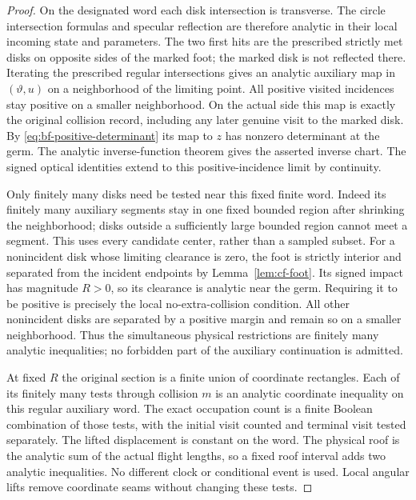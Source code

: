 \begin{proof}
On the designated word each disk intersection is transverse.
The circle intersection formulas and specular reflection are
therefore analytic in their local incoming state and parameters.
The two first hits are the prescribed strictly met disks on opposite
sides of the marked foot; the marked disk is not reflected there.
Iterating the prescribed regular intersections gives an analytic
auxiliary map in $(\vartheta,u)$ on a neighborhood of the limiting
point.  All positive visited incidences stay positive on a smaller
neighborhood.  On the actual side this map is exactly the original
collision record, including any later genuine visit to the marked
disk.  By \eqref{eq:bf-positive-determinant} its map to $z$ has
nonzero determinant at the germ.  The analytic inverse-function
theorem gives the asserted inverse chart.  The signed optical
identities extend to this positive-incidence limit by continuity.

Only finitely many disks need be tested near this fixed finite
word.  Indeed its finitely many auxiliary segments stay in one
fixed bounded region after shrinking the neighborhood; disks
outside a sufficiently large bounded region cannot meet a segment.
This uses every candidate center, rather than a sampled subset.
For a nonincident disk whose limiting clearance is zero, the foot
is strictly interior and separated from the incident endpoints by
Lemma~\ref{lem:cf-foot}.  Its signed impact has magnitude $R>0$,
so its clearance is analytic near the germ.  Requiring it to be
positive is precisely the local no-extra-collision condition.
All other nonincident disks are separated by a positive margin
and remain so on a smaller neighborhood.  Thus the simultaneous
physical restrictions are finitely many analytic inequalities; no
forbidden part of the auxiliary continuation is admitted.

At fixed $R$ the original section is a finite union of coordinate
rectangles.  Each of its finitely many tests through collision $m$
is an analytic coordinate inequality on this regular auxiliary
word.  The exact occupation count is a finite Boolean combination
of those tests, with the initial visit counted and terminal visit
tested separately.  The lifted displacement is constant on the
word.  The physical roof is the analytic sum of the actual flight
lengths, so a fixed roof interval adds two analytic inequalities.
No different clock or conditional event is used.  Local angular
lifts remove coordinate seams without changing these tests.


\end{proof}
